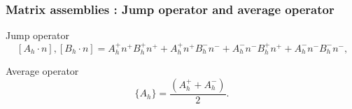 \documentclass{beamer}
\begin{document}

\begin{frame}
\frametitle{Matrix assemblies : Jump operator and average operator}

\begin{block}{Jump operator}
\begin{equation} \label{Jump operator L2}
[A_h \cdot n],[B_h \cdot n] = A_h^+ n^+ B_h^+ n^+ + A_h^+ n^+ B_h^- n^- + A_h^- n^- B_h^+ n^+ + A_h^- n^- B_h^- n^- \textrm{,}
\end{equation}
\end{block}

\begin{block}{Average operator}
\begin{equation}\label{Average operator}
\lbrace A_h \rbrace = \frac{(A_h^+ + A_h^-)}{2} \textrm{.}
\end{equation}
\end{block}

\end{frame}
\end{document}
